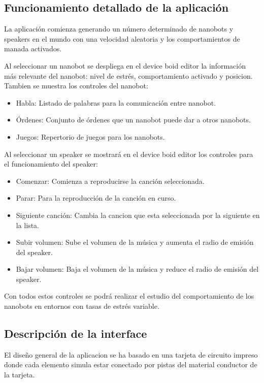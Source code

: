 \subsection{Funcionamiento detallado de la aplicación}
\label{sec:funcionamiento_aplicacion}
La aplicación comienza generando un número determinado de nanobots y speakers en el mundo con una velocidad aleatoria y los comportamientos de manada activados. 

Al seleccionar un nanobot se despliega en el device boid editor la información más relevante del nanobot: nivel de estrés, comportamiento activado y posicion. Tambien se muestra los controles del nanobot: 
\begin{itemize}
 \item Habla: Listado de palabras para la comunicación entre nanobot.
 \item Órdenes: Conjunto de órdenes que un nanobot puede dar a otros nanobots.
 \item Juegos: Repertorio de juegos para los nanobots.
\end{itemize}

Al seleccionar un speaker se mostrará en el device boid editor los controles para el funcionamiento del speaker:
\begin{itemize}
 \item Comenzar: Comienza a reproducirse la canción seleccionada.
 \item Parar: Para la reproducción de la canción en curso.
 \item Siguiente canción: Cambia la cancion que esta seleccionada por la siguiente en la lista.
 \item Subir volumen: Sube el volumen de la música y aumenta el radio de emisión del speaker.
 \item Bajar volumen: Baja el volumen de la música y reduce el radio de emisión del speaker.
\end{itemize}

Con todos estos controles se podrá realizar el estudio del comportamiento de los nanobots en entornos con tasas de estrés variable.

\subsection{Descripción de la interface}
\label{sec:descricion_interface}
El diseño general de la aplicacion se ha basado en una tarjeta de circuito impreso donde cada elemento simula estar conectado por pistas del material conductor de la tarjeta.

